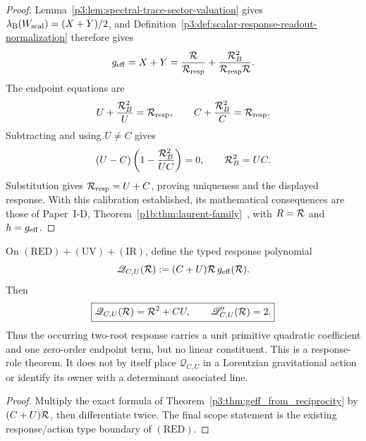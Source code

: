 \documentclass[12pt,a4paper]{article}
\begin{document}
\begin{proof}
Lemma~\ref{p3:lem:spectral-trace-sector-valuation} gives
\(\lambda_{\rm B}(W_{\rm scal})=(X+Y)/2\), and
Definition~\ref{p3:def:scalar-response-readout-normalization} therefore gives
\[
 g_{\mathrm{eff}}=X+Y
 =\frac{\mathcal R}{\mathcal R_{\rm resp}}
  +\frac{\mathcal R_B^2}{\mathcal R_{\rm resp}\mathcal R}.
\]
The endpoint equations are
\[
 U+\frac{\mathcal R_B^2}{U}=\mathcal R_{\rm resp},
 \qquad
 C+\frac{\mathcal R_B^2}{C}=\mathcal R_{\rm resp}.
\]
Subtracting and using \(U\ne C\) gives
\[
 (U-C)\left(1-\frac{\mathcal R_B^2}{UC}\right)=0,
 \qquad
 \mathcal R_B^2=UC.
\]
Substitution gives \(\mathcal R_{\rm resp}=U+C\), proving uniqueness and the
displayed response.  With this calibration established, its mathematical
consequences are those of Paper~I-D,
Theorem~\ref{p1b:thm:laurent-family}~\cite{Kugelmann2026Paper1D}, with
\(R=\mathcal R\) and \(h=g_{\mathrm{eff}}\).
\end{proof}

\begin{corollary}
\label{p3d:cor:primitive-unit-quadratic-response}
On \((\mathrm{RED})+(\mathrm{UV})+(\mathrm{IR})\), define the typed
response polynomial
\[
 \mathscr Q_{C,U}(\mathcal R)
 :=(C+U)\mathcal R\,g_{\rm eff}(\mathcal R).
\]
Then
\[
 \boxed{\mathscr Q_{C,U}(\mathcal R)=\mathcal R^2+CU,\qquad
        \mathscr Q_{C,U}''(\mathcal R)=2.}
\]
Thus the occurring two-root response carries a unit primitive quadratic
coefficient and one zero-order endpoint term, but no linear constituent.
This is a response-role theorem.  It does not by itself place
\(\mathscr Q_{C,U}\) in a Lorentzian gravitational action or identify its
owner with a determinant associated line.
\end{corollary}

\begin{proof}
Multiply the exact formula of
Theorem~\ref{p3:thm:geff_from_reciprocity} by
\((C+U)\mathcal R\), then differentiate twice.  The final scope statement is the
existing response/action type boundary of \((\mathrm{RED})\).
\end{proof}
\end{document}
